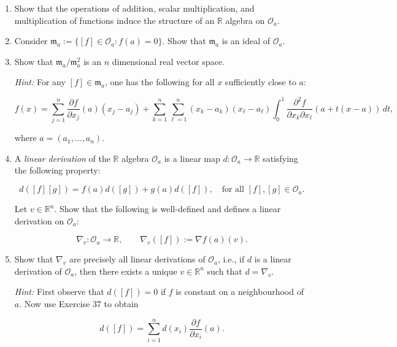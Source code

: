 \documentclass{book}
\begin{document}
\begin{enumerate}
\item Show that the operations of addition, scalar multiplication, and multiplication of functions induce the structure of an $\mathbb{R}$ algebra on $\mathcal{O}_a$.

\item Consider $\mathfrak{m}_a := \{[f] \in \mathcal{O}_a : f(a)=0\}$. Show that $\mathfrak{m}_a$ is an ideal of $\mathcal{O}_a$.

\item Show that $\mathfrak{m}_a/\mathfrak{m}_a^2$ is an $n$ dimensional real vector space.

\textit{Hint:} For any $[f] \in \mathfrak{m}_a$, one has the following for all $x$ sufficiently close to $a$:

\[
f(x)=\sum_{j=1}^{n}\frac{\partial f}{\partial x_j}(a)(x_j-a_j)
+\sum_{k=1}^{n}\sum_{\ell=1}^{n}(x_k-a_k)(x_\ell-a_\ell)
\int_{0}^{1}\frac{\partial^2 f}{\partial x_k\partial x_\ell}(a+t(x-a))\,dt,
\]

where $a=(a_1,\dots,a_n)$.

\item A \textit{linear derivation} of the $\mathbb{R}$ algebra $\mathcal{O}_a$ is a linear map $d:\mathcal{O}_a\to\mathbb{R}$ satisfying the following property:

\[
d([f][g]) = f(a)d([g]) + g(a)d([f]), \quad \text{for all } [f],[g]\in\mathcal{O}_a.
\]

Let $v\in\mathbb{R}^n$. Show that the following is well-defined and defines a linear derivation on $\mathcal{O}_a$:

\[
\nabla_v:\mathcal{O}_a\to\mathbb{R}, \qquad \nabla_v([f]) := \nabla f(a)(v).
\]

\item Show that $\nabla_v$ are precisely all linear derivations of $\mathcal{O}_a$, i.e., if $d$ is a linear derivation of $\mathcal{O}_a$, then there exists a unique $v\in\mathbb{R}^n$ such that $d=\nabla_v$.

\textit{Hint:} First observe that $d([f])=0$ if $f$ is constant on a neighbourhood of $a$. Now use Exercise 37 to obtain

\[
d([f])=\sum_{i=1}^{n} d(x_i)\frac{\partial f}{\partial x_i}(a).
\]
\end{enumerate}
\end{document}
